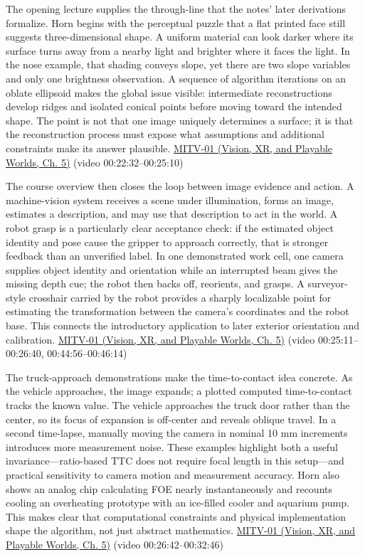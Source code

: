 The opening lecture supplies the through-line that the notes' later derivations formalize. Horn begins with the perceptual puzzle that a flat printed face still suggests three-dimensional shape. A uniform material can look darker where its surface turns away from a nearby light and brighter where it faces the light. In the nose example, that shading conveys slope, yet there are two slope variables and only one brightness observation. A sequence of algorithm iterations on an oblate ellipsoid makes the global issue visible: intermediate reconstructions develop ridges and isolated conical points before moving toward the intended shape. The point is not that one image uniquely determines a surface; it is that the reconstruction process must expose what assumptions and additional constraints make its answer plausible. \href{../07-Vision-XR-and-Playable-Worlds/main.pdf\#nameddest=04-visual-computing-ii-ch036-mitv-01---introduction-to-machine-vision}{MITV-01 (Vision, XR, and Playable Worlds, Ch. 5)} (video 00:22:32--00:25:10)

The course overview then closes the loop between image evidence and action. A machine-vision system receives a scene under illumination, forms an image, estimates a description, and may use that description to act in the world. A robot grasp is a particularly clear acceptance check: if the estimated object identity and pose cause the gripper to approach correctly, that is stronger feedback than an unverified label. In one demonstrated work cell, one camera supplies object identity and orientation while an interrupted beam gives the missing depth cue; the robot then backs off, reorients, and grasps. A surveyor-style crosshair carried by the robot provides a sharply localizable point for estimating the transformation between the camera's coordinates and the robot base. This connects the introductory application to later exterior orientation and calibration. \href{../07-Vision-XR-and-Playable-Worlds/main.pdf\#nameddest=04-visual-computing-ii-ch036-mitv-01---introduction-to-machine-vision}{MITV-01 (Vision, XR, and Playable Worlds, Ch. 5)} (video 00:25:11--00:26:40, 00:44:56--00:46:14)

The truck-approach demonstrations make the time-to-contact idea concrete. As the vehicle approaches, the image expands; a plotted computed time-to-contact tracks the known value. The vehicle approaches the truck door rather than the center, so its focus of expansion is off-center and reveals oblique travel. In a second time-lapse, manually moving the camera in nominal 10 mm increments introduces more measurement noise. These examples highlight both a useful invariance---ratio-based TTC does not require focal length in this setup---and practical sensitivity to camera motion and measurement accuracy. Horn also shows an analog chip calculating FOE nearly instantaneously and recounts cooling an overheating prototype with an ice-filled cooler and aquarium pump. This makes clear that computational constraints and physical implementation shape the algorithm, not just abstract mathematics. \href{../07-Vision-XR-and-Playable-Worlds/main.pdf\#nameddest=04-visual-computing-ii-ch036-mitv-01---introduction-to-machine-vision}{MITV-01 (Vision, XR, and Playable Worlds, Ch. 5)} (video 00:26:42--00:32:46)

